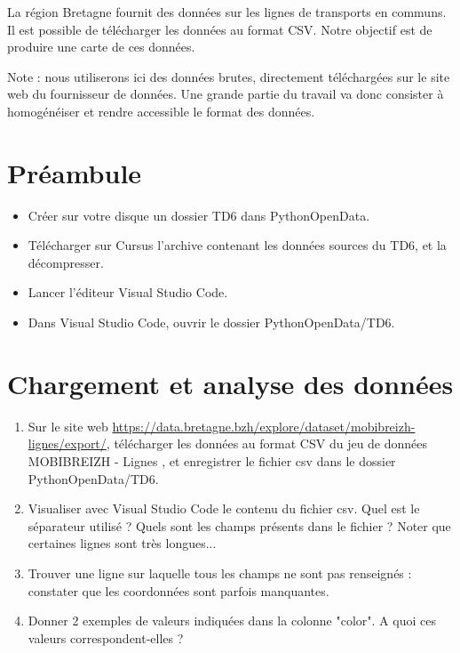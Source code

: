 \documentclass[11pt,a4paper]{article}
\begin{document}
La région Bretagne fournit des données sur les lignes de transports en communs.
Il est possible de télécharger les données au format CSV. 
Notre objectif est de produire une carte de ces données.

Note : nous utiliserons ici des données brutes, directement téléchargées sur le site web du fournisseur de données. 
Une grande partie du travail va donc consister à homogénéiser et rendre accessible le format des données. 


\section*{Préambule}
\begin{itemize}
    \item Créer sur votre disque un dossier TD6 dans PythonOpenData. 
    \item Télécharger sur Cursus l'archive contenant les données sources du TD6, et la décompresser.
    \item Lancer l'éditeur Visual Studio Code.
    \item Dans Visual Studio Code, ouvrir le dossier PythonOpenData/TD6. 
\end{itemize}



\section{Chargement et analyse des données}

\begin{enumerate}
    \item Sur le site web \url{https://data.bretagne.bzh/explore/dataset/mobibreizh-lignes/export/}, télécharger les données au format CSV du jeu de données \og MOBIBREIZH - Lignes \fg, et enregistrer le fichier csv dans le dossier PythonOpenData/TD6.
    \item Visualiser avec Visual Studio Code le contenu du fichier csv. Quel est le séparateur utilisé ? Quels sont les champs présents dans le fichier ? Noter que certaines lignes sont très longues...
    \item Trouver une ligne sur laquelle tous les champs ne sont pas renseignés : constater que les coordonnées sont parfois manquantes.
    \item Donner 2 exemples de valeurs indiquées dans la colonne "color". A quoi ces valeurs correspondent-elles ?
   \end{enumerate}
\end{document}
